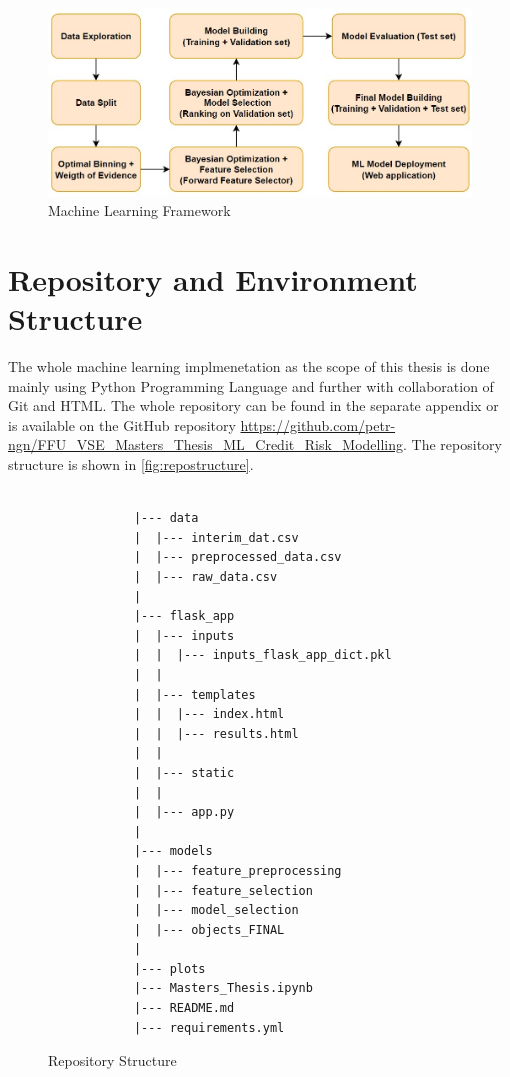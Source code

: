 \begin{figure}[H]
\centering
\caption{Machine Learning Framework}\vspace{0.5em}
\label{fig:mlframe}
\includegraphics[width=120mm]{Figures/ml_framework.jpg}

\vspace{-1em}
\end{figure}

\section{Repository and Environment Structure}

The whole machine learning implmenetation as the scope of this thesis is done mainly using Python Programming Language and further with collaboration of Git and HTML.
The whole repository can be found in the separate appendix or is available on the GitHub repository \url{https://github.com/petr-ngn/FFU_VSE_Masters_Thesis_ML_Credit_Risk_Modelling}.
The repository structure is shown in \autoref{fig:repostructure}.
\begin{figure}[H]
\centering\caption{Repository Structure}
\label{fig:repostructure}

{\footnotesize
\begin{verbatim}

            |--- data
            |  |--- interim_dat.csv
            |  |--- preprocessed_data.csv
            |  |--- raw_data.csv
            |
            |--- flask_app
            |  |--- inputs
            |  |  |--- inputs_flask_app_dict.pkl
            |  |
            |  |--- templates
            |  |  |--- index.html
            |  |  |--- results.html
            |  |
            |  |--- static
            |  |
            |  |--- app.py
            |
            |--- models
            |  |--- feature_preprocessing
            |  |--- feature_selection
            |  |--- model_selection
            |  |--- objects_FINAL
            |
            |--- plots
            |--- Masters_Thesis.ipynb
            |--- README.md
            |--- requirements.yml
\end{verbatim}
}
\vspace{0em}
\end{figure}


